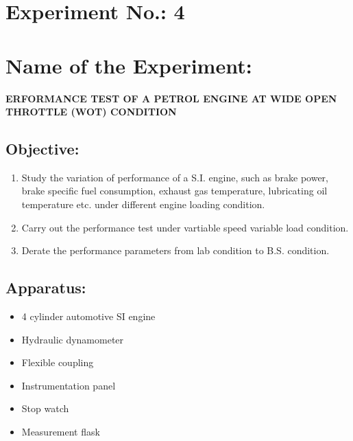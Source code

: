 \documentclass[14pt]{article}
\begin{document}
\section*{Experiment No.: 4}
\section*{Name of the Experiment:}
\textbf{ERFORMANCE TEST OF A PETROL ENGINE AT WIDE OPEN THROTTLE (WOT) CONDITION}

\subsection*{Objective:}
\begin{enumerate}
    \item Study the variation of performance of a S.I. engine, such as brake power, brake specific fuel consumption, exhaust gas temperature, lubricating oil temperature etc. under different engine loading condition.
    \item Carry out the performance test under vartiable speed variable load condition. 
    \item Derate the performance parameters from lab condition to B.S. condition. 
\end{enumerate}


\subsection*{Apparatus:}
\begin{itemize}
    \item 4 cylinder automotive SI engine 
    \item Hydraulic dynamometer 
    \item Flexible coupling
    \item Instrumentation panel
    \item Stop watch 
    \item Measurement flask
\end{itemize}
\end{document}
